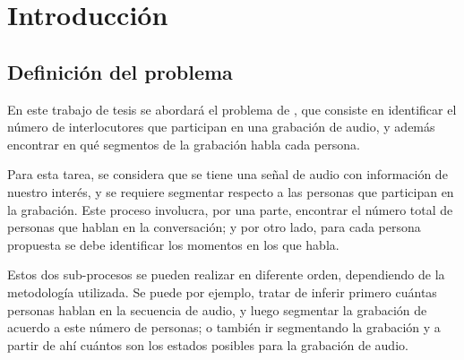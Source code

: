 
\chapter{Introducción}\label{ch:chap1}


\section{Definición del problema} 
\label{sec:definicion}
        
En este trabajo de tesis se abordará el problema de \SD, que consiste en identificar el número de interlocutores que participan en una grabación de audio, y además encontrar en qué segmentos de la grabación habla cada persona.

Para esta tarea, se considera que se tiene una señal de audio con información de nuestro interés, y se requiere segmentar respecto a las personas que participan en la grabación. Este proceso involucra, por una parte, encontrar el número total de personas que hablan en la conversación; y por otro lado, para cada persona propuesta se debe identificar los momentos en los que habla.

Estos dos sub-procesos se pueden realizar en diferente orden, dependiendo de la metodología utilizada. Se puede por ejemplo, tratar de inferir primero cuántas personas hablan en la secuencia de audio, y luego segmentar la grabación de acuerdo a este número de personas; o también ir segmentando la grabación y a partir de ahí cuántos son los estados posibles para la grabación de audio.

